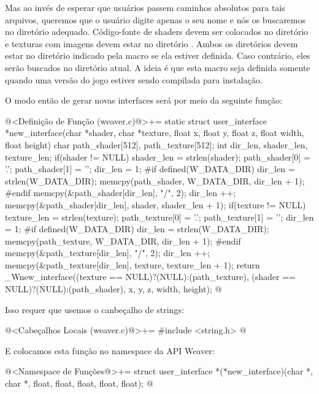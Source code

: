 Mas ao invés de esperar que usuários passem caminhos absolutos para
tais arquivos, queremos que o usuário digite apenas o seu nome e nós
os buscaremos no diretório adequado. Código-fonte de shaders devem ser
colocados no diretório  e texturas com imagens
devem estar no diretório . Ambos os diretórios
devem estar no diretório indicado pela macro 
se ela estiver definida. Caso contrário, eles serão buscados no
diretório atual. A ideia é que esta macro seja definida somente quando
uma versão do jogo estiver sendo compilada para instalação.

O modo então de gerar novas interfaces será por meio da seguinte
função:

\iniciocodigo
@<Definição de Função (weaver.c)@>+=
static struct user_interface *new_interface(char *shader, char *texture,
                                            float x, float y, float z,
                                            float width, float height){
  char path_shader[512], path_texture[512];
  int dir_len, shader_len, texture_len;
  if(shader != NULL){
    shader_len = strlen(shader);
    path_shader[0] = '.';
    path_shader[1] = '\0';
    dir_len = 1;
#if defined(W_DATA_DIR)
    dir_len = strlen(W_DATA_DIR);
    memcpy(path_shader, W_DATA_DIR, dir_len + 1);
#endif
    memcpy(&path_shader[dir_len], "/", 2);
    dir_len ++;
    memcpy(&path_shader[dir_len], shader, shader_len + 1);
  }
  if(texture != NULL){
    texture_len = strlen(texture);
    path_texture[0] = '.';
    path_texture[1] = '\0';
    dir_len = 1;
#if defined(W_DATA_DIR)
    dir_len = strlen(W_DATA_DIR);
    memcpy(path_texture, W_DATA_DIR, dir_len + 1);
#endif
    memcpy(&path_texture[dir_len], "/", 2);
    dir_len ++;
    memcpy(&path_texture[dir_len], texture, texture_len + 1);
  }  
  return _Wnew_interface((texture == NULL)?(NULL):(path_texture),
                         (shader == NULL)?(NULL):(path_shader),
                         x, y, z, width, height);
}
@
\fimcodigo

Isso requer que usemos o canbeçalho de strings:

\iniciocodigo
@<Cabeçalhos Locais (weaver.c)@>+=
#include <string.h>
@
\fimcodigo

E colocamos esta função no namespace da API Weaver:

\iniciocodigo
@<Namespace de Funções@>+=
struct user_interface *(*new_interface)(char *, char *, float, float,
                                        float, float, float);
@
\fimcodigo

